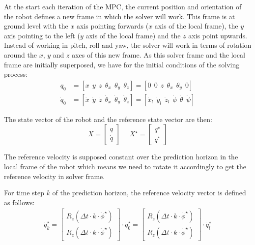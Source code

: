 \documentclass[a4paper,11pt]{article}
\begin{document}
At the start each iteration of the MPC, the current position and orientation of the robot defines a new frame in which the solver will work. This frame is at ground level with the $x$ axis pointing forwards ($x$ axis of the local frame), the $y$ axis pointing to the left ($y$ axis of the local frame) and the $z$ axis point upwards. Instead of working in pitch, roll and yaw, the solver will work in terms of rotation around the $x$, $y$ and $z$ axes of this new frame. As this solver frame and the local frame are initially superposed, we have for the initial conditions of the solving process:
\begin{align}
q_0 &= [x ~~ y ~~ z ~~ \theta_x ~~ \theta_y ~~ \theta_z ] = [0 ~~ 0 ~~ z ~~ \theta_x ~~ \theta_y ~~ 0] \\
\dot q_0 &= [\dot x ~~ \dot y ~~ \dot z ~~ \dot \theta_x ~~ \dot \theta_y ~~ \dot \theta_z ] = [\dot x_l ~~ \dot y_l ~~ \dot z_l ~~ \dot \phi ~~ \dot \theta ~~ \dot \psi ]
\end{align}

The state vector of the robot and the reference state vector are then: 
\begin{equation}X = \begin{bmatrix} q \\ \dot q \end{bmatrix} \text{~~~~}X^\star = \begin{bmatrix} q^{\star} \\ \dot q^{\star} \end{bmatrix}\end{equation}

The reference velocity is supposed constant over the prediction horizon in the local frame of the robot which means we need to rotate it accordingly to get the reference velocity in solver frame.

For time step $k$ of the prediction horizon, the reference velocity vector is defined as follows:
\begin{align}
\dot q_k^\star = \begin{bmatrix} R_z(\Delta t \cdot k \cdot \dot \phi^\star) \\ R_z(\Delta t \cdot k \cdot \dot \phi^\star) \end{bmatrix}  \cdot  \dot q_0^\star = \begin{bmatrix} R_z(\Delta t \cdot k \cdot \dot \phi^\star) \\ R_z(\Delta t \cdot k \cdot \dot \phi^\star) \end{bmatrix} \cdot \dot q_l^\star 
\end{align}
\end{document}
